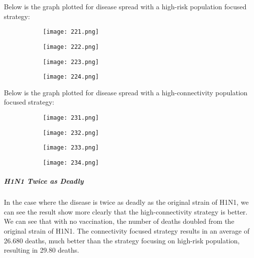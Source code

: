 \documentclass[titlepage]{article}
\begin{document}
Below is the graph plotted for disease spread with a high-risk population focused strategy:


\begin{figure}[H]
       \centering
       \begin{subfigure}{0.48\textwidth}
       \centering
       \texttt{[image: 221.png]}
       \end{subfigure}\quad
       \begin{subfigure}{0.48\textwidth}
       \centering
       \texttt{[image: 222.png]}
       \end{subfigure}
              \begin{subfigure}{0.48\textwidth}
       \centering
       \texttt{[image: 223.png]}
       \end{subfigure}\quad
       \begin{subfigure}{0.48\textwidth}
       \centering
       \texttt{[image: 224.png]}
       \end{subfigure}
\end{figure}

Below is the graph plotted for disease spread with a high-connectivity population focused strategy:

\begin{figure}[H]
       \centering
       \begin{subfigure}{0.48\textwidth}
       \centering
       \texttt{[image: 231.png]}
       \end{subfigure}\quad
       \begin{subfigure}{0.48\textwidth}
       \centering
       \texttt{[image: 232.png]}
       \end{subfigure}
              \begin{subfigure}{0.48\textwidth}
       \centering
       \texttt{[image: 233.png]}
       \end{subfigure}\quad
       \begin{subfigure}{0.48\textwidth}
       \centering
       \texttt{[image: 234.png]}
       \end{subfigure}
\end{figure}

\subparagraph{H1N1 Twice as Deadly}

In the case where the disease is twice as deadly as the original strain of H1N1, we can see the result show more clearly that the high-connectivity strategy is better. We can see that with no vaccination, the number of deaths doubled from the original strain of H1N1. The connectivity focused strategy results in an average of 26.680 deaths, much better than the strategy focusing on high-risk population, resulting in 29.80 deaths.
\end{document}
